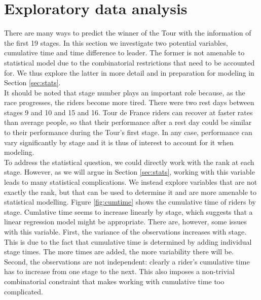 \documentclass[aos,preprint]{imsart}
\begin{document}
\section{Exploratory data analysis} \label{sec:eda}


There are many ways to predict the winner of the Tour with the information of the first 19 stages. In this section we investigate two potential variables, cumulative time and time difference to leader. The former is not amenable to statistical model due to the combinatorial restrictions that need to be accounted for. We thus explore the latter in more detail and in preparation for modeling in Section \ref{sec:stats}. \\

It should be noted that stage number plays an important role because, as the race progresses, the riders become more tired. There were two rest days between stages 9 and 10 and 15 and 16. Tour de France riders can recover at faster rates than average people, so that their performance after a rest day could be similar to their performance during the Tour's first stage. In any case, performance can vary significantly by stage and it is thus of interest to account for it when modeling. \\



To address the statistical question, we could directly work with the rank at each stage. However, as we will argue in Section \ref{sec:stats}, working with this variable leads to many statistical complications. We instead explore variables that are not exactly the rank, but that can be used to determine it and are more amenable to statistical modelling. Figure \ref{fig:cumtime} shows the cumulative time of riders by stage. Cumlative time seems to increase linearly by stage, which suggests that a linear regression model might be appropriate. There are, however, some issues with this variable. First, the variance of the observations increases with stage. This is due to the fact that cumulative time is determined by adding individual stage times. The more times are added, the more variability there will be. Second, the observations are not independent: clearly a rider's cumulative time has to increase from one stage to the next. This also imposes a non-trivial combinatorial constraint that makes working with cumulative time too complicated. \\
\end{document}
